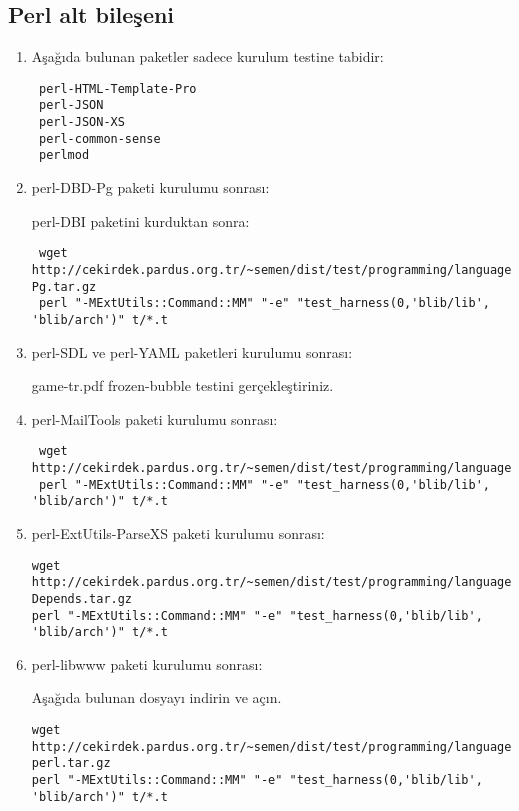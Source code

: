 \documentclass[a4paper,10pt]{article}
\begin{document}
\subsection{Perl alt bileşeni}
\begin{enumerate}
\item Aşağıda bulunan paketler sadece kurulum testine tabidir:
\begin{verbatim}
 perl-HTML-Template-Pro
 perl-JSON
 perl-JSON-XS
 perl-common-sense
 perlmod
\end{verbatim}

\item perl-DBD-Pg paketi kurulumu sonrası:

perl-DBI paketini kurduktan sonra:

\begin{verbatim}
 wget http://cekirdek.pardus.org.tr/~semen/dist/test/programming/language/perl/DBD-Pg.tar.gz
 perl "-MExtUtils::Command::MM" "-e" "test_harness(0,'blib/lib', 'blib/arch')" t/*.t
\end{verbatim}

\item perl-SDL ve perl-YAML paketleri kurulumu sonrası:

game-tr.pdf frozen-bubble testini gerçekleştiriniz.

\item perl-MailTools paketi kurulumu sonrası:
\begin{verbatim}
 wget http://cekirdek.pardus.org.tr/~semen/dist/test/programming/language/perl/MailTools.tar.gz
 perl "-MExtUtils::Command::MM" "-e" "test_harness(0,'blib/lib', 'blib/arch')" t/*.t
\end{verbatim}

\item perl-ExtUtils-ParseXS paketi kurulumu sonrası:

\begin{verbatim}
wget http://cekirdek.pardus.org.tr/~semen/dist/test/programming/language/perl/ExtUtils-Depends.tar.gz 
perl "-MExtUtils::Command::MM" "-e" "test_harness(0,'blib/lib', 'blib/arch')" t/*.t
\end{verbatim}


\item perl-libwww paketi kurulumu sonrası:

Aşağıda bulunan dosyayı indirin ve açın.
\begin{verbatim}
wget http://cekirdek.pardus.org.tr/~semen/dist/test/programming/language/perl/libwww-perl.tar.gz
perl "-MExtUtils::Command::MM" "-e" "test_harness(0,'blib/lib', 'blib/arch')" t/*.t
\end{verbatim}


\end{enumerate}
\end{document}
